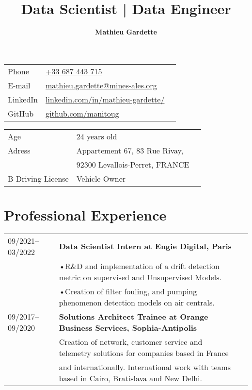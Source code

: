 \documentclass[9pt]{article}
\title{\bfseries\Huge Data Scientist | Data Engineer}
\author{\bfseries Mathieu Gardette}
\date{}
\begin{document}
    \maketitle
    \begin{minipage}[ht]{0.48\textwidth}
        \begin{tabular}{lll}
            Phone&\href{tel:+33687443715}{+33 687 443 715}\\
            E-mail&\href{mailto:mathieu.gardette@mines-ales.org}{mathieu.gardette@mines-ales.org}\\
            LinkedIn&\href{https://www.linkedin.com/in/mathieu-gardette/}{linkedin.com/in/mathieu-gardette/}\\
            GitHub& \href{https://github.com/manitoug}{github.com/manitoug}\\
        \end{tabular}
    \end{minipage}
    \begin{minipage}[ht]{0.48\textwidth}
        \begin{tabular}{lll}
            Age&24 years old\\
            Adress&Appartement 67, 83 Rue Rivay,\\
            &92300 Levallois-Perret, FRANCE\\
            B Driving License & Vehicle Owner\\
        \end{tabular}
    \end{minipage}


    \section*{Professional Experience}
    \begin{tabular}{lll}
        09/2021--03/2022&{\bf Data Scientist Intern at Engie Digital, Paris}\\
        &•R\&D and implementation of a drift detection metric on supervised and Unsupervised Models.\\
        &•Creation of filter fouling, and pumping phenomenon detection models on air centrals.\\

        09/2017--09/2020&{\bf Solutions Architect Trainee at Orange Business Services, Sophia-Antipolis}\\
        &Creation of network, customer service and telemetry solutions for companies based in France \\
        &and internationally. International work with teams based in Cairo, Bratislava and New Delhi.\\
    \end{tabular}
\end{document}
